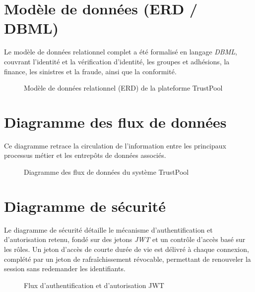 \documentclass[12pt,a4paper]{report}
\begin{document}
\section{Modèle de données (ERD / DBML)}
Le modèle de données relationnel complet a été formalisé en langage \textit{DBML}, couvrant l'identité et la vérification d'identité, les groupes et adhésions, la finance, les sinistres et la fraude, ainsi que la conformité.

\begin{figure}[H]
    \centering
    \caption{Modèle de données relationnel (ERD) de la plateforme TrustPool}
    \label{fig:erd}
\end{figure}

\section{Diagramme des flux de données}
Ce diagramme retrace la circulation de l'information entre les principaux processus métier et les entrepôts de données associés.

\begin{figure}[H]
    \centering
    \caption{Diagramme des flux de données du système TrustPool}
    \label{fig:flux-donnees}
\end{figure}

\section{Diagramme de sécurité}
Le diagramme de sécurité détaille le mécanisme d'authentification et d'autorisation retenu, fondé sur des jetons \textit{JWT} et un contrôle d'accès basé sur les rôles. Un jeton d'accès de courte durée de vie est délivré à chaque connexion, complété par un jeton de rafraîchissement révocable, permettant de renouveler la session sans redemander les identifiants.

\begin{figure}[H]
    \centering
    \caption{Flux d'authentification et d'autorisation JWT}
    \label{fig:securite}
\end{figure}
\end{document}
